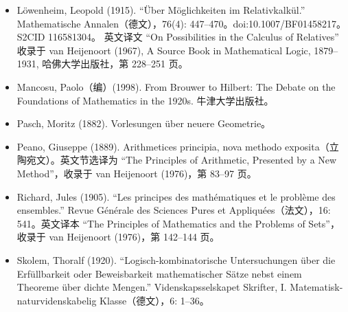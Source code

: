 \begin{itemize}
  \item Löwenheim, Leopold (1915). “Über Möglichkeiten im Relativkalkül.” Mathematische Annalen（德文），76(4): 447–470。doi:10.1007/BF01458217。S2CID 116581304。  
        英文译文 “On Possibilities in the Calculus of Relatives” 收录于 van Heijenoort (1967), A Source Book in Mathematical Logic, 1879–1931, 哈佛大学出版社，第 228–251 页。
  \item Mancosu, Paolo（编）(1998). From Brouwer to Hilbert: The Debate on the Foundations of Mathematics in the 1920s. 牛津大学出版社。
  \item Pasch, Moritz (1882). Vorlesungen über neuere Geometrie。
  \item Peano, Giuseppe (1889). Arithmetices principia, nova methodo exposita（立陶宛文）。英文节选译为 “The Principles of Arithmetic, Presented by a New Method”，收录于 van Heijenoort (1976)，第 83–97 页。
  \item Richard, Jules (1905). “Les principes des mathématiques et le problème des ensembles.” Revue Générale des Sciences Pures et Appliquées（法文），16: 541。英文译本 “The Principles of Mathematics and the Problems of Sets”，收录于 van Heijenoort (1976)，第 142–144 页。
  \item Skolem, Thoralf (1920). “Logisch-kombinatorische Untersuchungen über die Erfüllbarkeit oder Beweisbarkeit mathematischer Sätze nebst einem Theoreme über dichte Mengen.” Videnskapsselskapet Skrifter, I. Matematisk-naturvidenskabelig Klasse（德文），6: 1–36。
\end{itemize}
